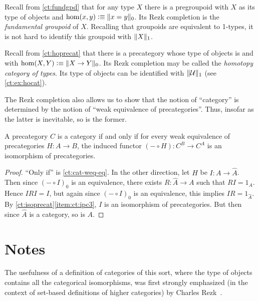 \begin{eg}
  Recall from \autoref{ct:fundgpd} that for any type $X$ there is a pregroupoid with $X$ as its type of objects and $\hom(x,y) \defeq \pizero{x=y}$.
  Its Rezk completion is the \emph{fundamental groupoid} of $X$.
  Recalling that groupoids are equivalent to 1-types, it is not hard to identify this groupoid with $\trunc1X$.
\end{eg}

\begin{eg}\label{ct:hocat}
  Recall from \autoref{ct:hoprecat} that there is a precategory whose type of objects is \type and with $\hom(X,Y) \defeq \pizero{X\to Y}$.
  Its Rezk completion may be called the \emph{homotopy category of types}.
  Its type of objects can be identified with $\trunc1\type$ (see \autoref{ct:ex:hocat}).
\end{eg}

The Rezk completion also allows us to show that the notion of ``category'' is determined by the notion of ``weak equivalence of precategories''.
Thus, insofar as the latter is inevitable, so is the former.

\begin{thm}
  A precategory $C$ is a category if and only if for every weak equivalence of precategories $H:A\to B$, the induced functor $(-\circ H):C^B \to C^A$ is an isomorphism of precategories.
\end{thm}
\begin{proof}
  ``Only if'' is \autoref{ct:cat-weq-eq}.
  In the other direction, let $H$ be $I:A\to\widehat A$.
  Then since $(-\circ I)_0$ is an equivalence, there exists $R:\widehat A\to A$ such that $RI=1_A$.
  Hence $IRI=I$, but again since $(-\circ I)_0$ is an equivalence, this implies $IR =1_{\widehat A}$.
  By \autoref{ct:isoprecat}\ref{item:ct:ipc3}, $I$ is an isomorphism of precategories.
  But then since $\widehat A$ is a category, so is $A$.
\end{proof}


\newpage

\section*{Notes}
\label{sec:ct:notes}

The usefulness of a definition of categories of this sort, where the type of objects contains all the categorical isomorphisms, was first strongly emphasized (in the context of set-based definitions of higher categories) by Charles Rezk~\cite{rezk01css}.

